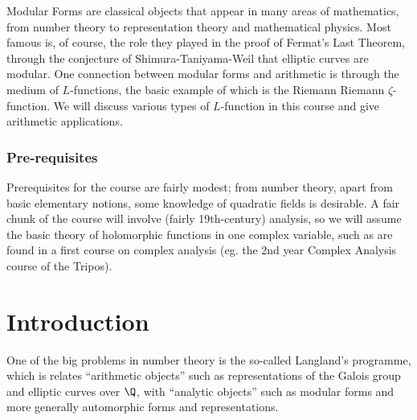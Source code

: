 \documentclass[a4paper]{article}
\begin{document}
\maketitle
{\small
\setlength{\parindent}{0em}
\setlength{\parskip}{1em}
Modular Forms are classical objects that appear in many areas of mathematics, from number theory to representation theory and mathematical physics. Most famous is, of course, the role they played in the proof of Fermat's Last Theorem, through the conjecture of Shimura-Taniyama-Weil that elliptic curves are modular. One connection between modular forms and arithmetic is through the medium of $L$-functions, the basic example of which is the Riemann Riemann $\zeta$-function. We will discuss various types of $L$-function in this course and give arithmetic applications.

\subsubsection*{Pre-requisites}
Prerequisites for the course are fairly modest; from number theory, apart from basic elementary notions, some knowledge of quadratic fields is desirable. A fair chunk of the course will involve (fairly 19th-century) analysis, so we will assume the basic theory of holomorphic functions in one complex variable, such as are found in a first course on complex analysis (eg. the 2nd year Complex Analysis course of the Tripos).
}
\tableofcontents

\setcounter{section}{-1}
\section{Introduction}
One of the big problems in number theory is the so-called Langland's programme, which is relates ``arithmetic objects'' such as representations of the Galois group and elliptic curves over $\Q$, with ``analytic objects'' such as modular forms and more generally automorphic forms and representations.
\end{document}
